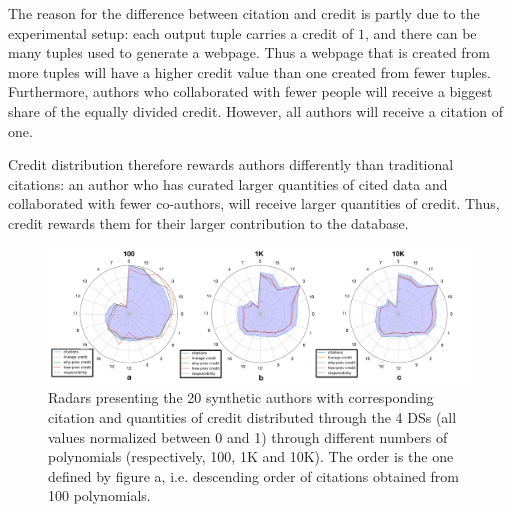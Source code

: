 The reason for the difference between citation and credit is partly due to the experimental setup:  each output tuple carries a credit of $1$, and there can be many tuples used to generate a webpage.  Thus a webpage that is created from more tuples will have a higher credit value than one created from fewer tuples. Furthermore, authors who collaborated with fewer people will receive a biggest share of the equally divided credit.  However, all authors will receive a citation of one.

Credit distribution therefore rewards authors differently than traditional citations: an author who has curated larger quantities of cited data and collaborated with fewer co-authors, will receive larger quantities of credit. Thus, credit rewards them for their larger contribution to the database. 




\begin{figure}[t]
\centering
  \includegraphics[width=1\textwidth]{figures/fixed_radars}
  \caption{
  Radars presenting the 20 synthetic authors with corresponding citation and quantities of credit distributed through the 4 DSs (all values normalized between 0 and 1) through different numbers of polynomials (respectively, 100, 1K and 10K). 
  The order is the one defined by figure a, i.e. descending order of citations  obtained from 100 polynomials. }
  \label{figure:3_radars}
\end{figure}

